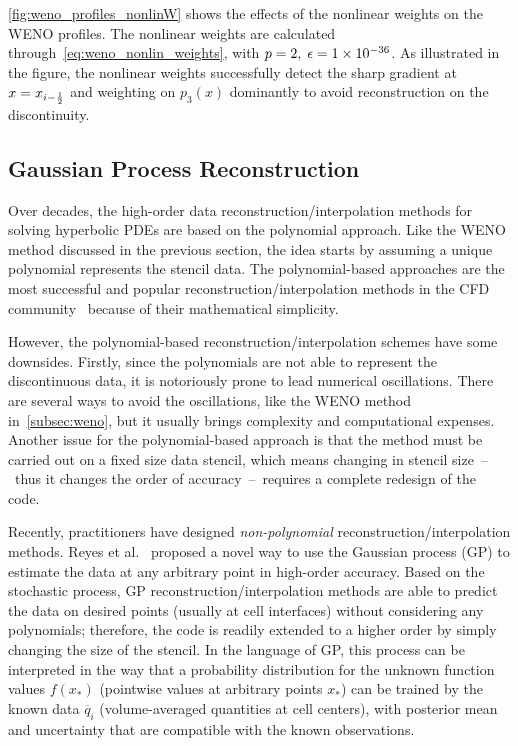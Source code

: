 \cref{fig:weno_profiles_nonlinW} shows the effects of the nonlinear weights on the WENO profiles.
The nonlinear weights are calculated through~\cref{eq:weno_nonlin_weights}, with \( p = 2, \; \epsilon = \num{1.E-36} \).
As illustrated in the figure, the nonlinear weights successfully detect the sharp gradient at \( x = x_{{i-\frac{1}{2}}} \)
and weighting on \( p_{3} (x) \) dominantly to avoid reconstruction on the discontinuity.



\subsection{Gaussian Process Reconstruction}\label{subsec:gp}

Over decades, the high-order data reconstruction/interpolation methods
for solving hyperbolic PDEs are based on the polynomial approach.
Like the WENO method discussed in the previous section,
the idea starts by assuming a unique polynomial represents the stencil data.
The polynomial-based approaches are the most successful and popular reconstruction/interpolation methods
in the CFD community~\cite{van1979towards,colella1984piecewise,jiang1996efficient,lee2017piecewise}
because of their mathematical simplicity. 

However, the polynomial-based reconstruction/interpolation schemes have some downsides.
Firstly, since the polynomials are not able to represent the discontinuous data,
it is notoriously prone to lead numerical oscillations.
There are several ways to avoid the oscillations, like the WENO method in~\ref{subsec:weno},
but it usually brings complexity and computational expenses.
Another issue for the polynomial-based approach is that the method must be carried out
on a fixed size data stencil, which means changing in stencil size~--~thus it changes the order
of accuracy~--~requires a complete redesign of the code.

Recently, practitioners have designed \textit{non-polynomial} reconstruction/interpolation methods.
Reyes et al.~\cite{reyes2018new,reyes2019variable} proposed a novel way to use the Gaussian process (GP)
to estimate the data at any arbitrary point in high-order accuracy.
Based on the stochastic process, GP reconstruction/interpolation methods are able to predict the data
on desired points (usually at cell interfaces) without considering any polynomials;
therefore, the code is readily extended to a higher order by simply changing the size of the stencil.
In the language of GP, this process can be interpreted in the way that
a probability distribution for the unknown function values \( f(x_{*})\) (pointwise values at arbitrary points \( x_{*} \))
can be trained by the known data \( \overline{q}_{i} \) (volume-averaged quantities at cell centers),
with posterior mean and uncertainty that are compatible with the known observations.

